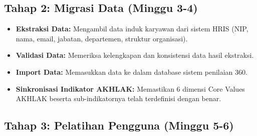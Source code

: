 \documentclass[12pt,a4paper,oneside]{report}
\begin{document}
\subsection{Tahap 2: Migrasi Data (Minggu 3-4)}

\begin{itemize}
  \item \textbf{Ekstraksi Data:} Mengambil data induk karyawan dari sistem HRIS (NIP, nama, email, jabatan, departemen, struktur organisasi).
  \item \textbf{Validasi Data:} Memeriksa kelengkapan dan konsistensi data hasil ekstraksi.
  \item \textbf{Import Data:} Memasukkan data ke dalam database sistem penilaian 360\textdegree{}.
  \item \textbf{Sinkronisasi Indikator AKHLAK:} Memastikan 6 dimensi Core Values AKHLAK beserta sub-indikatornya telah terdefinisi dengan benar.
\end{itemize}

\subsection{Tahap 3: Pelatihan Pengguna (Minggu 5-6)}
\end{document}
